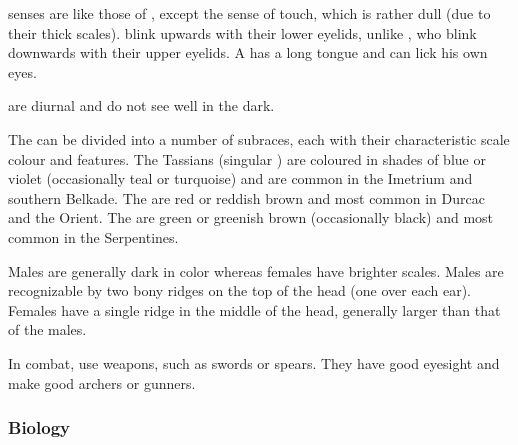\Scathaese{} senses are like those of \humans, except the sense of touch, which is rather dull (due to their thick scales). %
\Scathae{} blink upwards with their lower eyelids, unlike \humans, who blink downwards with their upper eyelids. A \scatha{} has a long tongue and can lick his own eyes. 

\Scathae{} are diurnal and do not see well in the dark. 

The \scathae{} can be divided into a number of subraces, each with their characteristic scale colour and features. The Tassians (singular ) are coloured in shades of blue or violet (occasionally teal or turquoise) and are common in the Imetrium and southern Belkade. The \intro{\Mekrii} are red or reddish brown and most common in Durcac and the Orient. The  are green or greenish brown (occasionally black) and most common in the Serpentines. 

Males are generally dark in color whereas females have brighter scales. Males are recognizable by two bony ridges on the top of the head (one over each ear). Females have a single ridge in the middle of the head, generally larger than that of the males. 

In combat, \scathae{} use weapons, such as swords or spears. They have good eyesight and make good archers or gunners. 

\subsubsection{Biology}

